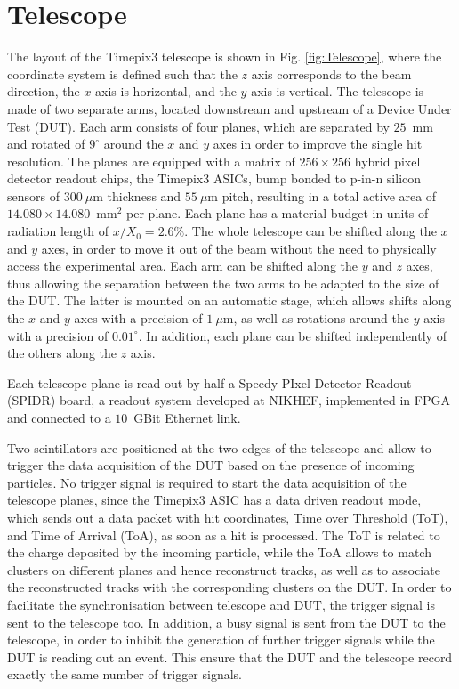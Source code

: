 \section{Telescope}
\label{sec:Telescope}

The layout of the Timepix3 telescope is shown in Fig. \ref{fig:Telescope}, where the coordinate system is defined such that the $z$ axis corresponds to the beam direction, the $x$ axis is horizontal, and the $y$ axis is vertical.
The telescope is made of two separate arms, located downstream and upstream of a Device Under Test (DUT). Each arm consists of four planes, which are separated by $25$~mm and rotated of $9^\circ$ around the $x$ and $y$ axes in order to improve the single hit resolution. The planes are equipped with a matrix of $256 \times 256$ hybrid pixel detector readout chips, the Timepix3 ASICs, bump bonded to p-in-n silicon sensors of $300~\mu$m thickness and $55~\mu$m pitch, resulting in a total active area of $14.080 \times 14.080$~mm$^2$ per plane. Each plane has a material budget in units of radiation length of $x/X_0 = 2.6\%$.
The whole telescope can be shifted along the $x$ and $y$ axes, in order to move it out of the beam without the need to physically access the experimental area.
Each arm can be shifted along the $y$ and $z$ axes, thus allowing the separation between the two arms to be adapted to the size of the DUT. The latter is mounted on an automatic stage, which allows shifts along the $x$ and $y$ axes with a precision of $1~\mu$m, as well as rotations around the $y$ axis with a precision of $0.01^\circ$. In addition, each plane can be shifted independently of the others along the $z$ axis.

Each telescope plane is read out by half a Speedy PIxel Detector Readout (SPIDR) board, a readout system developed at NIKHEF, implemented in FPGA and connected to a $10$~GBit Ethernet link.

Two scintillators are positioned at the two edges of the telescope and allow to trigger the data acquisition of the DUT based on the presence of incoming particles.
No trigger signal is required to start the data acquisition of the telescope planes, since the Timepix3 ASIC has a data driven readout mode, which sends out a data packet with hit coordinates, Time over Threshold (ToT), and Time of Arrival (ToA), as soon as a hit is processed.
The ToT is related to the charge deposited by the incoming particle, while the ToA allows to match clusters on different planes and hence reconstruct tracks, as well as to associate the reconstructed tracks with the corresponding clusters on the DUT.
In order to facilitate the synchronisation between telescope and DUT, the trigger signal is sent to the telescope too.
In addition, a busy signal is sent from the DUT to the telescope, in order to inhibit the generation of further trigger signals while the DUT is reading out an event. This ensure that the DUT and the telescope record exactly the same number of trigger signals.


